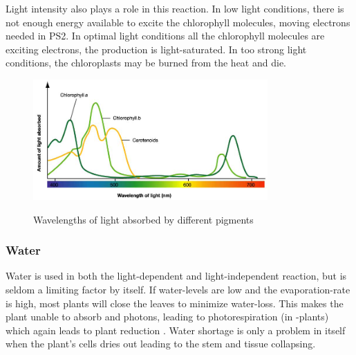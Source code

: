 Light intensity also plays a role in this reaction. In low light conditions, there is not enough energy available to excite the chlorophyll molecules, moving electrons needed in PS2. In optimal light conditions all the chlorophyll molecules are exciting electrons, the production is light-saturated. In too strong light conditions, the chloroplasts may be burned from the heat and die.  

\begin{figure}
        \centering
        \includegraphics[width=0.8\textwidth]{img/photosynthesis/absorption-spectrum.png}
        \caption{Wavelengths of light absorbed by different pigments}
        \citep{uicbiology}
        \label{fig:wavelengthabsorbtion}
\end{figure}

\subsubsection{Water}
Water is used in both the light-dependent and light-independent reaction, but is seldom a limiting factor by itself. If water-levels are low and the evaporation-rate is high, most plants will close the leaves to minimize water-loss. This makes the plant unable to absorb  and photons, leading to photorespiration (in -plants) which again leads to plant reduction \citep{bi2}. Water shortage is only a problem in itself when the plant’s cells dries out leading to the stem and tissue collapsing. 
